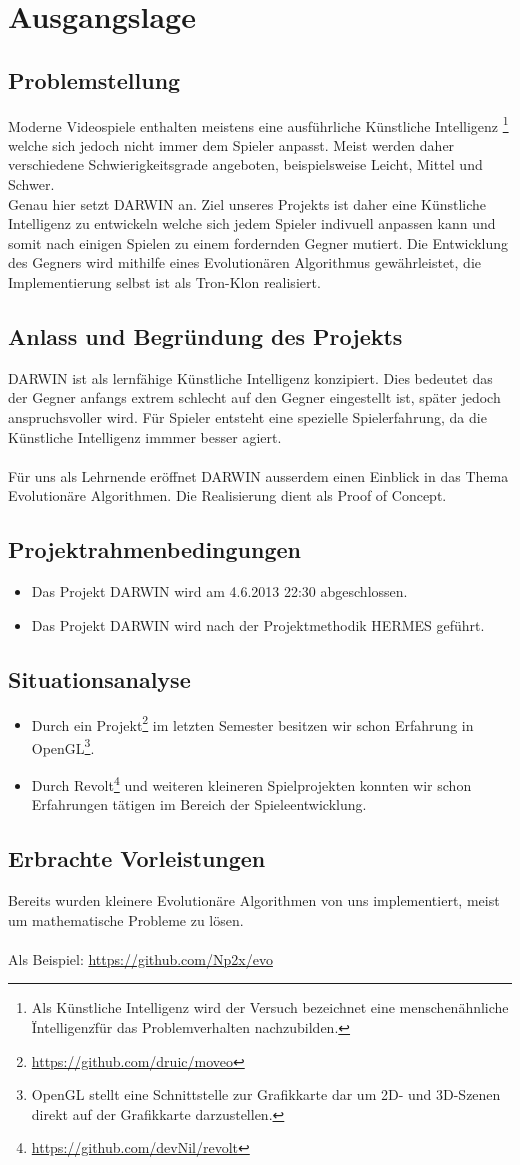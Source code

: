 \section{Ausgangslage}
\subsection{Problemstellung}
Moderne Videospiele enthalten meistens eine ausführliche Künstliche Intelligenz
\footnote{Als Künstliche Intelligenz wird der Versuch bezeichnet eine menschenähnliche \"Intelligenz\" für das Problemverhalten nachzubilden.} welche sich jedoch nicht immer dem Spieler anpasst. Meist werden daher verschiedene Schwierigkeitsgrade angeboten, beispielsweise Leicht, Mittel und Schwer.\\
Genau hier setzt DARWIN an. Ziel unseres Projekts ist daher eine Künstliche Intelligenz zu entwickeln welche sich jedem Spieler indivuell anpassen kann und somit nach einigen Spielen zu einem fordernden Gegner mutiert. Die Entwicklung des Gegners wird mithilfe eines Evolutionären Algorithmus gewährleistet, die Implementierung selbst ist als Tron-Klon realisiert.
\subsection{Anlass und Begründung des Projekts}
DARWIN ist als lernfähige Künstliche Intelligenz konzipiert. Dies bedeutet das der Gegner anfangs extrem schlecht auf den Gegner eingestellt ist, später jedoch anspruchsvoller wird. Für Spieler entsteht eine spezielle Spielerfahrung, da die Künstliche Intelligenz immmer besser agiert. \\\\Für uns als Lehrnende eröffnet DARWIN ausserdem einen Einblick in das Thema Evolutionäre Algorithmen. Die Realisierung dient als Proof of Concept.
\subsection{Projektrahmenbedingungen}
\begin{itemize}
	\item Das Projekt DARWIN wird am 4.6.2013 22:30 abgeschlossen.
	\item Das Projekt DARWIN wird nach der Projektmethodik HERMES geführt.
\end{itemize}
\subsection{Situationsanalyse}
\begin{itemize}
	\item Durch ein Projekt\footnote{\url{https://github.com/druic/moveo}} im letzten Semester besitzen wir schon Erfahrung in
	OpenGL\footnote{OpenGL stellt eine Schnittstelle zur Grafikkarte dar um 2D- und 3D-Szenen direkt auf der Grafikkarte darzustellen.}.
	\item Durch Revolt\footnote{\url{https://github.com/devNil/revolt}} und weiteren kleineren Spielprojekten konnten wir schon Erfahrungen
	tätigen im Bereich der Spieleentwicklung.
\end{itemize}
\subsection{Erbrachte Vorleistungen}
Bereits wurden kleinere Evolutionäre Algorithmen von uns implementiert, meist um mathematische Probleme zu lösen.
\\\\ Als Beispiel: \url{https://github.com/Np2x/evo}